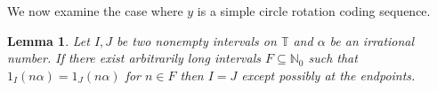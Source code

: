 \documentclass[11pt,reqno]{amsart}
\newtheorem{lemma}[theorem]{Lemma}
\theoremstyle{definition}
\theoremstyle{plain}
\newcommand{\N}{\mathbb{N}}
\newcommand{\T}{\mathbb{T}}
\newcommand{\AuthornoteA}[2]{{\sf\small\color{magenta}{[#1: #2]}}}
\newcommand{\Anote}{\AuthornoteA{A}}
\begin{document}
We now examine the case where $y$ is a simple circle rotation coding sequence. 


\begin{lemma}\label{lem:two_coding_same_tail}
Let $I, J$ be two nonempty intervals on $\T$ and $\alpha$ be an irrational number. If there exist arbitrarily long intervals $F \subseteq \N_0$ such that $1_I(n \alpha) = 1_J(n \alpha)$ for $n \in F$ then $I = J$ except possibly at the endpoints.
\end{lemma}
\end{document}
